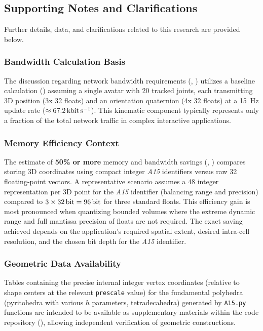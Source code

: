 \documentclass[10pt]{article}
\def\AAAB{\textit{A15}}
\begin{document}
\subsection{Supporting Notes and Clarifications}\label{subsec:supplementary-notes}

Further details, data, and clarifications related to this research are provided below.

\subsubsection{Bandwidth Calculation Basis}\label{subsubsec:notes-bandwidth}
The discussion regarding network bandwidth requirements (, ) utilizes a baseline calculation () assuming a single avatar with 20 tracked joints, each transmitting 3D position (3x \SI{32}{\bit} floats) and an orientation quaternion (4x \SI{32}{\bit} floats) at a \SI{15}{\hertz} update rate ($\approx \SI{67.2}{\kilo\bit\per\second}$). This kinematic component typically represents only a fraction of the total network traffic in complex interactive applications.

\subsubsection{Memory Efficiency Context}\label{subsubsec:notes-memory}
The estimate of \textbf{50\% or more} memory and bandwidth savings (, ) compares storing 3D coordinates using compact integer \AAAB{} identifiers versus raw \SI{32}{\bit} floating-point vectors. A representative scenario assumes a \SI{48}{\bit} integer representation per 3D point for the \AAAB{} identifier (balancing range and precision) compared to $3 \times \SI{32}{\bit} = \SI{96}{\bit}$ for three standard floats. This efficiency gain is most pronounced when quantizing bounded volumes where the extreme dynamic range and full mantissa precision of floats are not required. The exact saving achieved depends on the application's required spatial extent, desired intra-cell resolution, and the chosen bit depth for the \AAAB{} identifier.

\subsubsection{Geometric Data Availability}\label{subsubsec:notes-geometry}
Tables containing the precise internal integer vertex coordinates (relative to shape centers at the relevant \texttt{prescale} value) for the fundamental polyhedra (pyritohedra with various $h$ parameters, tetradecahedra) generated by \texttt{A15.py} functions are intended to be available as supplementary materials within the code repository (), allowing independent verification of geometric constructions.
\end{document}
